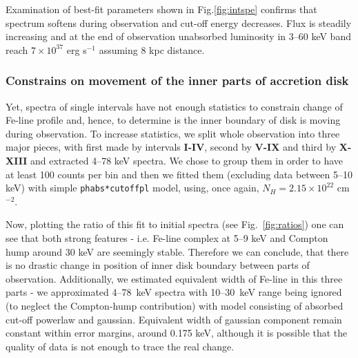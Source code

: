 \documentclass[a4paper,fleqn,usenatbib]{mnras}
\begin{document}
Examination of best-fit parameters shown in Fig.\ref{fig:intspe} confirms that spectrum softens during observation and cut-off energy decreases. Flux is steadily increasing and at the end of observation unabsorbed luminosity in 3--60 keV band reach  $7\times10^{37}$ erg s$^{-1}$ assuming 8 kpc distance. 

\subsubsection{Constrains on movement of the inner parts of accretion disk}
Yet, spectra of single intervals have not enough statistics to constrain change of Fe-line profile and, hence, to determine is the inner boundary of disk is moving during observation. To increase statistics, we split whole observation into three major pieces, with first made by intervals {\bf I-IV}, second by {\bf V-IX} and third by {\bf X-XIII} and extracted 4--78 keV spectra. 
We chose to group them in order to have at least 100 counts per bin and then we fitted them (excluding data between 5--10 keV) with simple \texttt{phabs*cutoffpl} model, using, once again, $N_{H} = 2.15\times10^{22}$ cm$^{-2}$.  

Now, plotting the ratio of this fit to initial spectra (see Fig.~\ref{fig:ratios}) one can see that both strong features - i.e. Fe-line complex at 5--9 keV and Compton hump around 30 keV are seemingly stable. Therefore we can conclude, that there is no drastic change in position of inner disk boundary between parts of observation. Additionally, we estimated equivalent width of Fe-line in this three parts - we approximated 4--78~keV spectra with 10--30~keV range being ignored (to neglect the Compton-hump contribution) with model consisting of absorbed cut-off powerlaw and gaussian. Equivalent width of gaussian component remain constant within error margins, around 0.175 keV, although it is possible that the quality of data is not enough to trace the real change.
\end{document}
